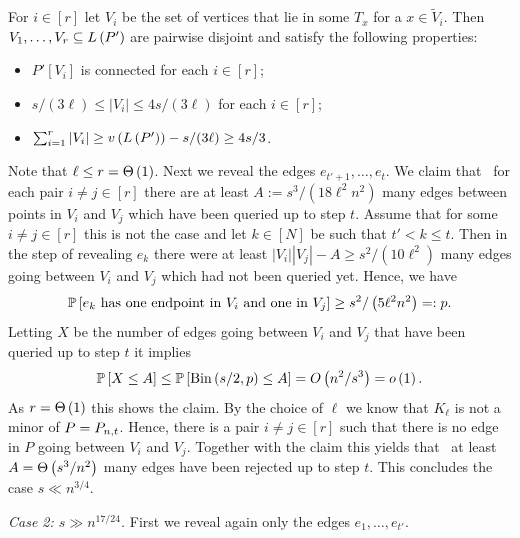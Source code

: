 For $i\in[r]$ let $V_i$ be the set of vertices that lie in some $T_x$ for a $x\in\tilde{V}_i$. Then $V_1, \ldots, V_r\subseteq L\left(P'\right)$ are pairwise disjoint and satisfy the following properties: 
\begin{itemize}
\item
$P'\left[V_i\right]$ is connected for each $i\in[r]$;
\item
$s/(3\ell)\leq |V_i|\leq 4s/(3\ell)$ for each $i\in[r]$;
\item
$\sum_{i=1}^{r}|V_i|\geq v\left({L\left(P'\right)}\right)-s/(3\ell)\geq 4s/3$.
\end{itemize}
Note that $\ell\leq r=\Theta\left(1\right)$. 
Next we reveal the edges $e_{t'+1}, \ldots, e_t$. We claim that \whp\ for each pair $i\neq j\in[r]$ there are at least $A:=s^3/\left(18\ell^2 n^2\right)$ many edges between points in $V_i$ and $V_j$ which have been queried up to step $t$. Assume that for some $i\neq j\in[r]$ this is not the case and let $k\in\left[N\right]$ be such that $t'<k\leq t$. Then in the step of revealing $e_k$ there were at least $|V_i||V_j|-A\geq s^2/\left(10\ell^2\right)$ many edges going between $V_i$ and $V_j$ which had not been queried yet. Hence, we have 
\begin{align*}
\mathbb{P}\left[e_k \text{ has one endpoint in }V_i \text{ and one in }V_j\right]\geq s^2/\left(5\ell^2n^2\right)=:p.
\end{align*}
Letting $X$ be the number of edges going between $V_i$ and $V_j$ that have been queried up to step $t$ it implies
\begin{align}\label{PPeq:1}
\mathbb{P}\left[X\leq A\right]\leq \mathbb{P}\left[\operatorname{Bin}\left(s/2,p\right)\leq A\right]=O\left(n^2/s^3\right)=o\left(1\right).
\end{align}
As $r=\Theta\left(1\right)$ this shows the claim. By the choice of $\ell$ we know that $K_\ell$ is not a minor of $P=P_{n,t}$. Hence, there is a pair $i\neq j\in[r]$ such that there is no edge in $P$ going between $V_i$ and $V_j$. Together with the claim this yields that \whp\ at least $A=\Theta\left(s^3/n^2\right)$ many edges have been rejected up to step $t$. This concludes the case $s\ll n^{3/4}$.

\textit{Case 2: $s\gg n^{17/24}$.}
First we reveal again only the edges $e_1, \ldots, e_{t'}$.

